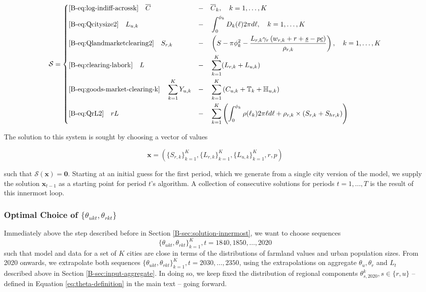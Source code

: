 \documentclass[11pt]{report}
\begin{document}
\begin{equation*}
    \mathcal{S} = \left \{
\begin{aligned} 
	&\eqref{B-eq:log-indiff-acrossk} \quad \overline{C}             &- & \quad \overline{C}_k,\quad k=1,\dots,K\\
	&\eqref{B-eq:Qcitysize2} \quad  L_{u,k}              &- & \quad \int_0^{\phi_k}D_k(\ell)2\pi d\ell,\quad k=1,\dots,K\\
	&\eqref{B-eq:Qlandmarketclearing2} \quad  S_{r,k}              &- & \quad \left(S-\pi\phi_k^2-\frac{L_{r,k} \gamma_r \left( w_{r,k}+r+ \underline{s}-p\underline{c}\right)}{ \rho_{r,k}}\right),\quad k=1,\dots,K\\
    &\eqref{B-eq:clearing-labork} \quad L                  &-& \quad  \sum_{k=1}^{K}(L_{r,k}+L_{u,k})\\
    &\eqref{B-eq:goods-market-clearing-k} \quad \sum_{k=1}^K  Y_{u,k}             &- & \quad \sum_{k=1}^K \left( C_{u,k} + \mathbb{T}_k + \mathbb{H}_{u,k} \right)\\
    &\eqref{B-eq:QrL2}\quad rL             &- & \quad \sum_{k=1}^K\left(\int_{0}^{\phi_k} \rho(\ell_k)2\pi\ell d\ell+\rho_{r,k} \times (S_{r,k} + S_{hr,k})\right)
\end{aligned}   \right.
\end{equation*}

The solution to this system is sought by choosing a vector of values 

\begin{equation}
	\mathbf{x} = \left( \{S_{r,k}\}_{k=1}^K,\{L_{r,k}\}_{k=1}^K,\{L_{u,k}\}_{k=1}^K,r,p\right)\label{B-eq:optimal-x}
\end{equation}


such that $\mathcal{S}(\mathbf{x}) = \mathbf{0}$. Starting at an initial guess for the first period, which we generate from a single city version of the model, we supply the solution $\mathbf{x}_{t-1}$ as a starting point for period $t$'s algorithm. A collection of consecutive solutions for periods $t=1,\dots,T$ is the result of this innermost loop.




\subsubsection{Optimal Choice of $\{\theta_{ukt},\theta_{rkt}\}$}\label{B-sec:solution-thetas}

Immediately above the step described before in Section \ref{B-sec:solution-innermost}, we want to choose sequences $$\{\theta_{ukt},\theta_{rkt}\}_{k=1}^K, t=1840,1850,\dots,2020$$ such that model and data for a set of $K$ cities are close in terms of the distributions of farmland values and urban population sizes. From 2020 onwards, we extrapolate both sequences $\{\theta_{ukt},\theta_{rkt}\}_{k=1}^K, t=2030,\dots,2350$, using the extrapolations on aggregate $\theta_u,\theta_r$ and $L_t$ described above in Section \ref{B-sec:input-aggregate}. In doing so, we keep fixed the distribution of regional components $\theta_{s,2020}^k, s \in \{r,u\}$ -- defined in Equation \eqref{eq:theta-definition} in the main text -- going forward.
\end{document}
